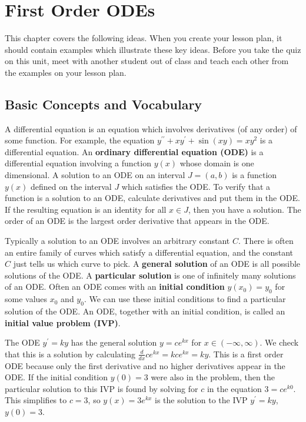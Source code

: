 
\chapter{First Order ODEs}

\noindent  
This chapter covers the following ideas. When you create your lesson plan, it should contain examples which illustrate these key ideas. Before you take the quiz on this unit, meet with another student out of class and teach each other from the examples on your lesson plan. 






\section{Basic Concepts and Vocabulary}
A differential equation is an equation which involves derivatives (of any order) of some function.  For example, the equation $y^{\prime\prime}+xy^\prime+\sin(xy)=xy^2$ is a differential equation. An \textbf{ordinary differential equation (ODE)} is a differential equation involving a function $y(x)$ whose domain is one dimensional. A solution to an ODE on an interval $J=(a,b)$ is a function $y(x)$ defined on the interval $J$ which satisfies the ODE.  To verify that a function is a solution to an ODE, calculate derivatives and put them in the ODE. If the resulting equation is an identity for all $x\in J$, then you have a solution. The order of an ODE is the largest order derivative that appears in the ODE. 

Typically a solution to an ODE involves an arbitrary constant $C$. There is often an entire family of curves which satisfy a differential equation, and the constant $C$ just tells us which curve to pick. A \textbf{general solution} of an ODE is all possible solutions of the ODE.  A \textbf{particular solution} is one of infinitely many solutions of an ODE. Often an ODE comes with an \textbf{initial condition} $y(x_0)=y_0$ for some values $x_0$ and $y_0$. We can use these initial conditions to find a particular solution of the ODE. An ODE, together with an initial condition, is called an \textbf{initial value problem (IVP)}.  

\begin{example}
The ODE $y^\prime = ky$ has the general solution $y=ce^{kx}$ for $x\in(-\infty,\infty)$. We check that this is a solution by calculating $\frac{d}{dx}ce^{kx} = kce^{kx}=ky$. This is a first order ODE because only the first derivative and no higher derivatives appear in the ODE.  If the initial condition $y(0)=3$ were also in the problem, then the particular solution to this IVP is found by solving for $c$ in the equation $3=ce^{k0}$.  This simplifies to $c=3$, so $y(x) = 3e^{kx}$ is the solution to the IVP  $y^\prime = ky$, $y(0)=3$.
\end{example}

